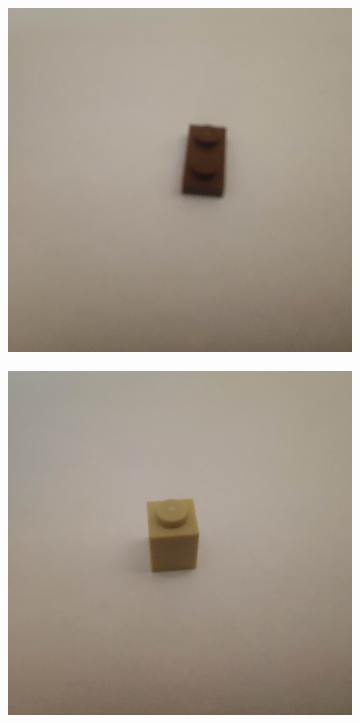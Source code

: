 \documentclass[]{article}
\begin{document}
\begin{figure}[h]
\begin{subfigure}[b]{0.2\textwidth}
    \end{subfigure}
    \begin{subfigure}[b]{0.2\textwidth}
        \includegraphics[width=\textwidth]{photographed images/17.jpg}
    \end{subfigure}
    \begin{subfigure}[b]{0.2\textwidth}
        \includegraphics[width=\textwidth]{photographed images/18.jpg}

\end{subfigure}
\end{figure}
\end{document}
